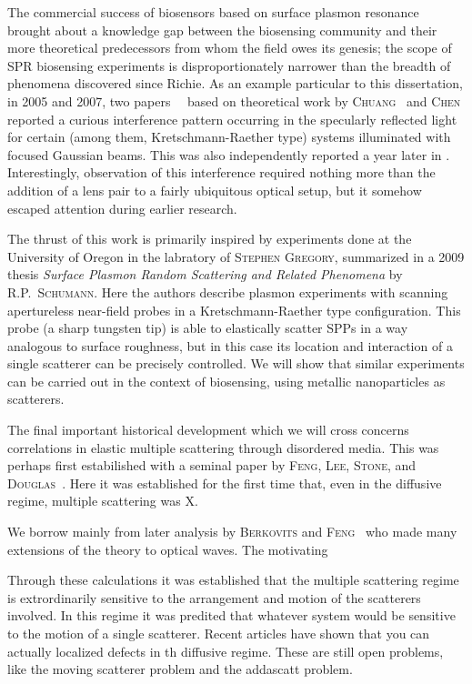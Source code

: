 \documentclass[a4paper,titlepage,onecolumn]{report}
\newcommand{\name}[1]{\textsc{#1}}
\begin{document}
The commercial success of biosensors based on surface plasmon resonance
brought about a knowledge gap between the biosensing community and their
more theoretical predecessors from whom the field owes its genesis; the
scope of SPR biosensing experiments is disproportionately narrower than the
breadth of phenomena discovered since Richie.  As an example particular to
this dissertation, in 2005 and 2007, two
papers~\cite{andaloro2005optical}~\cite{simon2007observation} based on
theoretical work by \name{Chuang}~\cite{chuang1986lateral} and
\name{Chen} \cite{chen1976excitation} reported a curious interference
pattern occurring in the specularly reflected light for certain (among
them, Kretschmann-Raether type) systems illuminated with focused Gaussian
beams.  This was also independently reported a year later in
\cite{schumann2008near}.  Interestingly, observation of this interference
required nothing more than the addition of a lens pair to a fairly
ubiquitous optical setup, but it somehow escaped attention during earlier
research.  

The thrust of this work is primarily inspired by experiments done at the
University of Oregon in the labratory of \name{Stephen Gregory}, summarized
in a 2009 thesis \textit{Surface Plasmon Random Scattering and Related
Phenomena} \cite{schumann2009surface} by \name{R\@.P.\@~Schumann}.  Here
the authors describe plasmon experiments with scanning apertureless
near-field probes in a Kretschmann-Raether type configuration.  This probe
(a sharp tungsten tip) is able to elastically scatter SPPs in a way
analogous to surface roughness, but in this case its location and
interaction of a single scatterer can be precisely controlled.  We will
show that similar experiments can be carried out in the context of
biosensing, using metallic nanoparticles as scatterers.

The final important historical development which we will cross concerns
correlations in elastic multiple scattering through disordered media.  This
was perhaps first estabilished with a seminal paper by \name{Feng},
\name{Lee}, \name{Stone}, and \name{Douglas}~\cite{feng1988correlations}.
Here it was established for the first time that, even in the diffusive
regime, multiple scattering was X.  

We borrow mainly from later analysis by \name{Berkovits} and
\name{Feng}~\cite{berkovits1994correlations} who made many extensions of
the theory to optical waves.  The motivating 

Through these calculations it was established
that the multiple scattering regime is extrordinarily sensitive to the
arrangement and motion of the scatterers involved.  In this regime it was
predited that whatever system would be sensitive to the motion of a single
scatterer.  Recent articles have shown that you can actually localized
defects in th diffusive regime.  These are still open problems, like the
moving scatterer problem and the addascatt problem.
\end{document}
